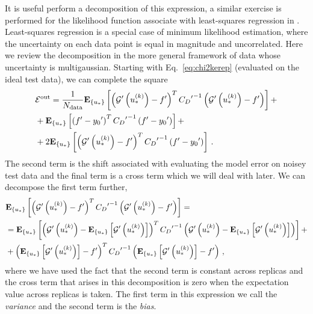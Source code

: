 It is useful perform a decomposition of this expression, a similar exercise is
performed for the likelihood function associate with least-squares regression in
\cite{mlforphysics}. Least-squares regression is a special case of minimum
likelihood estimation, where the uncertainty on each data point is equal in
magnitude and uncorrelated. Here we review the decomposition in the more general
framework of data whose uncertainty is multigaussian. Starting with
Eq.~\ref{eq:chi2kerep} (evaluated on the ideal test data), we can complete the
square
\begin{equation}
    \begin{split}
    \label{eq:EoutDecomposition}
        &\mathcal{E}^{\rm out} = \frac{1}{N_{\rm data}} \mathbf{E}_{\{ u_* \}} \left[ 
            \left( {{\mathcal{G}}^{\prime}}\left(u_*^{(k)}\right) - {{f}^{\prime}} \right)^T
            {{C_{D}}^{\prime}}^{-1}
            \left( {{\mathcal{G}}^{\prime}}\left(u_*^{(k)}\right) - {{f}^{\prime}} \right)
         \right] + \\
        &+ \mathbf{E}_{\{ u_* \}} \left[ 
            \left( {{f}^{\prime}} - {{y_0}^{\prime}} \right)^T
            {{C_{D}}^{\prime}}^{-1}
            \left( {{f}^{\prime}} - {{y_0}^{\prime}} \right)
         \right]+ \\
        &+ 2 \mathbf{E}_{\{ u_* \}} \left[ 
            \left( {{\mathcal{G}}^{\prime}}\left(u_*^{(k)}\right) - {{f}^{\prime}} \right)^T
            {{C_{D}}^{\prime}}^{-1}
            \left({{f}^{\prime}} - {{y_0}^{\prime}} \right)
         \right]\, .
    \end{split}
\end{equation}
The second term is the shift associated with evaluating the model error on
noisey test data and the final term is a cross term which we will deal with
later. We can decompose the first term further,
\begin{equation}
    \begin{split}
        &\mathbf{E}_{\{ u_* \}} \left[ 
            \left( {{\mathcal{G}}^{\prime}}\left(u_*^{(k)}\right) - {{f}^{\prime}} \right)^T
            {{C_{D}}^{\prime}}^{-1}
            \left( {{\mathcal{G}}^{\prime}}\left(u_*^{(k)}\right) - {{f}^{\prime}} \right)
         \right] = \\
        &= \mathbf{E}_{\{ u_* \}} \left[ 
            \left( {{\mathcal{G}}^{\prime}}\left(u_*^{(k)}\right) - 
            \mathbf{E}_{\{ u_* \}} \left[ {{\mathcal{G}}^{\prime}}\left(u_*^{(k)}\right) \right] \right)^T
            {{C_{D}}^{\prime}}^{-1}
            \left( {{\mathcal{G}}^{\prime}}\left(u_*^{(k)}\right) - 
            \mathbf{E}_{\{ u_* \}} \left[ {{\mathcal{G}}^{\prime}}\left(u_*^{(k)}\right) \right] \right)
         \right] + \\
        &+ \left( \mathbf{E}_{\{ u_* \}} \left[ {{\mathcal{G}}^{\prime}}\left(u_*^{(k)}\right) \right] - {{f}^{\prime}} \right)^T
        {{C_{D}}^{\prime}}^{-1}
        \left( \mathbf{E}_{\{ u_* \}} \left[ {{\mathcal{G}}^{\prime}}\left(u_*^{(k)}\right) \right] - {{f}^{\prime}} \right)\, ,
    \end{split}
\end{equation}
where we have used the fact that the second term is constant across replicas and
the cross term that arises in this decomposition is zero when the expectation
value across replicas is taken. The first term in this expression we call the
{\em variance} and the second term is the {\em bias}.

